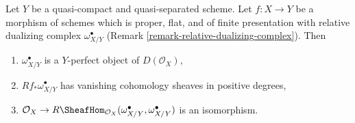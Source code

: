 \begin{lemma}
\label{lemma-properties-relative-dualizing}
Let $Y$ be a quasi-compact and quasi-separated scheme.
Let $f : X \to Y$ be a morphism of schemes which is
proper, flat, and of finite presentation with
relative dualizing complex $\omega_{X/Y}^\bullet$
(Remark \ref{remark-relative-dualizing-complex}).
Then
\begin{enumerate}
\item $\omega_{X/Y}^\bullet$ is a $Y$-perfect object of $D(\mathcal{O}_X)$,
\item $Rf_*\omega_{X/Y}^\bullet$ has vanishing cohomology sheaves
in positive degrees,
\item $\mathcal{O}_X \to
R\SheafHom_{\mathcal{O}_X}(\omega_{X/Y}^\bullet, \omega_{X/Y}^\bullet)$
is an isomorphism.
\end{enumerate}
\end{lemma}

